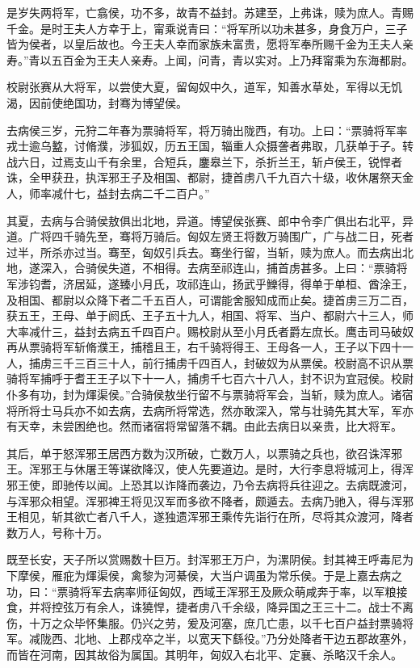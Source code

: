 \documentclass[]{article}
\begin{document}
是岁失两将军，亡翕侯，功不多，故青不益封。苏建至，上弗诛，赎为庶人。青赐千金。是时王夫人方幸于上，甯乘说青曰：``将军所以功未甚多，身食万户，三子皆为侯者，以皇后故也。今王夫人幸而家族未富贵，愿将军奉所赐千金为王夫人亲寿。''青以五百金为王夫人亲寿。上闻，问青，青以实对。上乃拜甯乘为东海都尉。

校尉张赛从大将军，以尝使大夏，留匈奴中久，道军，知善水草处，军得以无饥渴，因前使绝国功，封骞为博望侯。

去病侯三岁，元狩二年春为票骑将军，将万骑出陇西，有功。上曰：``票骑将军率戎士逾乌盭，讨脩濮，涉狐奴，历五王国，辎重人众摄詟者弗取，几获单于子。转战六日，过焉支山千有余里，合短兵，鏖皋兰下，杀折兰王，斩卢侯王，锐悍者诛，全甲获丑，执浑邪王子及相国、都尉，捷首虏八千九百六十级，收休屠祭天金人，师率减什七，益封去病二千二百户。''

其夏，去病与合骑侯敖俱出北地，异道。博望侯张赛、郎中令李广俱出右北平，异道。广将四千骑先至，骞将万骑后。匈奴左贤王将数万骑围广，广与战二日，死者过半，所杀亦过当。骞至，匈奴引兵去。骞坐行留，当斩，赎为庶人。而去病出北地，遂深入，合骑侯失道，不相得。去病至祁连山，捕首虏甚多。上曰：``票骑将军涉钧耆，济居延，遂臻小月氏，攻祁连山，扬武乎鱳得，得单于单桓、酋涂王，及相国、都尉以众降下者二千五百人，可谓能舍服知成而止矣。捷首虏三万二百，获五王，王母、单于阏氏、王子五十九人，相国、将军、当户、都尉六十三人，师大率减什三，益封去病五千四百户。赐校尉从至小月氏者爵左庶长。鹰击司马破奴再从票骑将军斩脩濮王，捕稽且王，右千骑将得王、王母各一人，王子以下四十一人，捕虏三千三百三十人，前行捕虏千四百人，封破奴为从票侯。校尉高不识从票骑将军捕呼于耆王王子以下十一人，捕虏千七百六十八人，封不识为宜冠侯。校尉仆多有功，封为煇渠侯。''合骑侯敖坐行留不与票骑将军会，当斩，赎为庶人。诸宿将所将士马兵亦不如去病，去病所将常选，然亦敢深入，常与壮骑先其大军，军亦有天幸，未尝困绝也。然而诸宿将常留落不耦。由此去病日以亲贵，比大将军。

其后，单于怒浑邪王居西方数为汉所破，亡数万人，以票骑之兵也，欲召诛浑邪王。浑邪王与休屠王等谋欲降汉，使人先要道边。是时，大行李息将城河上，得浑邪王使，即驰传以闻。上恐其以诈降而袭边，乃令去病将兵往迎之。去病既渡河，与浑邪众相望。浑邪裨王将见汉军而多欲不降者，颇遁去。去病乃驰入，得与浑邪王相见，斩其欲亡者八千人，遂独遗浑邪王乘传先诣行在所，尽将其众渡河，降者数万人，号称十万。

既至长安，天子所以赏赐数十巨万。封浑邪王万户，为漯阴侯。封其裨王呼毒尼为下摩侯，雁疪为煇渠侯，禽黎为河綦侯，大当户调虽为常乐侯。于是上嘉去病之功，曰：``票骑将军去病率师征匈奴，西域王浑邪王及厥众萌咸奔于率，以军粮接食，并将控弦万有余人，诛獟悍，捷者虏八千余级，降异国之王三十二。战士不离伤，十万之众毕怀集服。仍兴之劳，爰及河塞，庶几亡患，以千七百户益封票骑将军。减陇西、北地、上郡戍卒之半，以宽天下繇役。''乃分处降者干边五郡故塞外，而皆在河南，因其故俗为属国。其明年，匈奴入右北平、定襄、杀略汉千余人。
\end{document}
